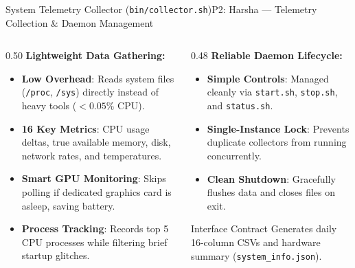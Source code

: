 
\begin{frame}{System Telemetry Collector (\texttt{bin/collector.sh})}{P2: Harsha --- Telemetry Collection \& Daemon Management}
\begin{columns}[T]
\begin{column}{0.50\textwidth}
\textbf{Lightweight Data Gathering:}
\begin{itemize}
    \item \textbf{Low Overhead}: Reads system files (\texttt{/proc}, \texttt{/sys}) directly instead of heavy tools ($<0.05\%$ CPU).
    \item \textbf{16 Key Metrics}: CPU usage deltas, true available memory, disk, network rates, and temperatures.
    \item \textbf{Smart GPU Monitoring}: Skips polling if dedicated graphics card is asleep, saving battery.
    \item \textbf{Process Tracking}: Records top 5 CPU processes while filtering brief startup glitches.
\end{itemize}
\end{column}

\begin{column}{0.48\textwidth}
\textbf{Reliable Daemon Lifecycle:}
\begin{itemize}
    \item \textbf{Simple Controls}: Managed cleanly via \texttt{start.sh}, \texttt{stop.sh}, and \texttt{status.sh}.
    \item \textbf{Single-Instance Lock}: Prevents duplicate collectors from running concurrently.
    \item \textbf{Clean Shutdown}: Gracefully flushes data and closes files on exit.
\end{itemize}

\vspace{0.3em}
\begin{block}{Interface Contract}
Generates daily 16-column CSVs and hardware summary (\texttt{system\_info.json}).
\end{block}
\end{column}
\end{columns}
\end{frame}

